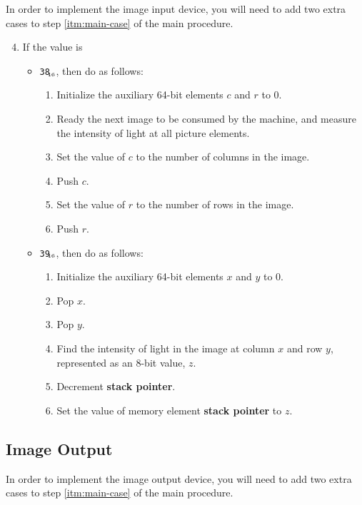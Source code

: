 \documentclass[a4paper,12pt]{article}
\newcommand{\num}[1]{\texttt{#1}\xspace}
\newcommand{\hex}[1]{\num{#1}$_{\textup{\tiny\hskip-1ex 16}}$\xspace}
\newcommand{\SP}{\textbf{stack pointer}\xspace}
\newcommand{\op}[1]{#1}
\newcommand{\READFRAME} [1]{\op{\hex{38}}}
\newcommand{\READPIXEL} [1]{\op{\hex{39}}}
\begin{document}
In order to implement the image input device, you will need to add two extra cases to step \ref{itm:main-case} of the main procedure.

\begin{enumerate}
  \setcounter{enumi}{3}
\item If the value is
  \begin{itemize}
  \item \READFRAME{}, then do as follows:
    \begin{enumerate}
    \item Initialize the auxiliary 64-bit elements $c$ and $r$ to 0.
    \item Ready the next image to be consumed by the machine, and measure the intensity of light at all picture elements.
    \item Set the value of $c$ to the number of columns in the image.
    \item Push $c$.
    \item Set the value of $r$ to the number of rows in the image.
    \item Push $r$.
    \end{enumerate}
  \item \READPIXEL{}, then do as follows:
    \begin{enumerate}
    \item Initialize the auxiliary 64-bit elements $x$ and $y$ to 0.
    \item Pop $x$.
    \item Pop $y$.
    \item Find the intensity of light in the image at column $x$ and row $y$, represented as an 8-bit value, $z$.
    \item Decrement \SP.
    \item Set the value of memory element \SP to $z$.
    \end{enumerate}
  \end{itemize}
\end{enumerate}

\subsection{Image Output}

In order to implement the image output device, you will need to add two extra cases to step \ref{itm:main-case} of the main procedure.
\end{document}
